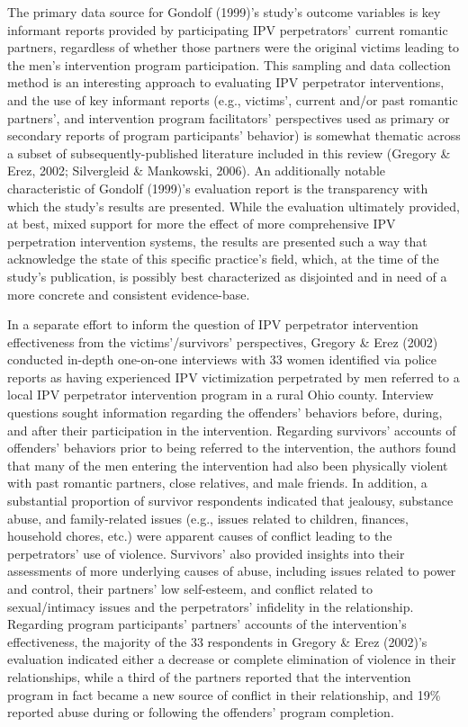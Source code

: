 \documentclass[11pt,]{tufte-book}
\begin{document}
The primary data source for Gondolf (1999)'s study's outcome variables
is key informant reports provided by participating IPV perpetrators'
current romantic partners, regardless of whether those partners were the
original victims leading to the men's intervention program
participation. This sampling and data collection method is an
interesting approach to evaluating IPV perpetrator interventions, and
the use of key informant reports (e.g., victims', current and/or past
romantic partners', and intervention program facilitators' perspectives
used as primary or secondary reports of program participants' behavior)
is somewhat thematic across a subset of subsequently-published
literature included in this review (Gregory \& Erez, 2002; Silvergleid
\& Mankowski, 2006). An additionally notable characteristic of Gondolf
(1999)'s evaluation report is the transparency with which the study's
results are presented. While the evaluation ultimately provided, at
best, mixed support for more the effect of more comprehensive IPV
perpetration intervention systems, the results are presented such a way
that acknowledge the state of this specific practice's field, which, at
the time of the study's publication, is possibly best characterized as
disjointed and in need of a more concrete and consistent evidence-base.

In a separate effort to inform the question of IPV perpetrator
intervention effectiveness from the victims'/survivors' perspectives,
Gregory \& Erez (2002) conducted in-depth one-on-one interviews with 33
women identified via police reports as having experienced IPV
victimization perpetrated by men referred to a local IPV perpetrator
intervention program in a rural Ohio county. Interview questions sought
information regarding the offenders' behaviors before, during, and after
their participation in the intervention. Regarding survivors' accounts
of offenders' behaviors prior to being referred to the intervention, the
authors found that many of the men entering the intervention had also
been physically violent with past romantic partners, close relatives,
and male friends. In addition, a substantial proportion of survivor
respondents indicated that jealousy, substance abuse, and family-related
issues (e.g., issues related to children, finances, household chores,
etc.) were apparent causes of conflict leading to the perpetrators' use
of violence. Survivors' also provided insights into their assessments of
more underlying causes of abuse, including issues related to power and
control, their partners' low self-esteem, and conflict related to
sexual/intimacy issues and the perpetrators' infidelity in the
relationship. Regarding program participants' partners' accounts of the
intervention's effectiveness, the majority of the 33 respondents in
Gregory \& Erez (2002)'s evaluation indicated either a decrease or
complete elimination of violence in their relationships, while a third
of the partners reported that the intervention program in fact became a
new source of conflict in their relationship, and 19\% reported abuse
during or following the offenders' program completion.
\end{document}

